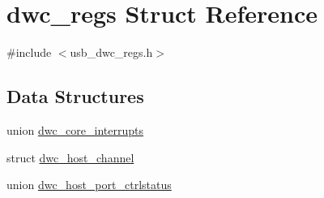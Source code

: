 \hypertarget{structdwc__regs}{\section{dwc\-\_\-regs Struct Reference}
\label{structdwc__regs}
}


{\ttfamily \#include $<$usb\-\_\-dwc\-\_\-regs.\-h$>$}

\subsection*{Data Structures}
\begin{DoxyCompactItemize}
\item 
union \hyperlink{uniondwc__regs_1_1dwc__core__interrupts}{dwc\-\_\-core\-\_\-interrupts}
\item 
struct \hyperlink{structdwc__regs_1_1dwc__host__channel}{dwc\-\_\-host\-\_\-channel}
\item 
union \hyperlink{uniondwc__regs_1_1dwc__host__port__ctrlstatus}{dwc\-\_\-host\-\_\-port\-\_\-ctrlstatus}
\end{DoxyCompactItemize}
